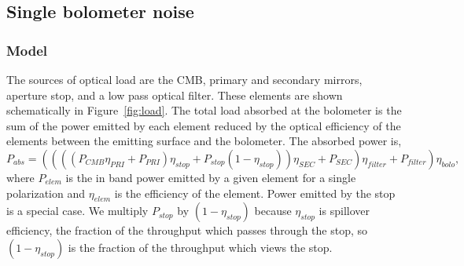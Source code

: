 \documentclass[]{spie}  %
\begin{document}
\subsection{Single bolometer noise}
\label{sec:det_noise}

\subsubsection{Model}

The sources of optical load are the CMB, primary and secondary mirrors, aperture stop, and a low pass optical filter.  These elements 
are shown schematically in Figure~\ref{fig:load}. 
%
The total load absorbed at the bolometer is the sum of the power emitted by each element reduced by the optical efficiency of the elements between 
the emitting surface and the bolometer.  
The absorbed power is,
\begin{equation}
\label{eq:load}
P_{abs} =  (((( P_{CMB} \eta_{PRI} + P_{PRI} ) \eta_{stop} + P_{stop}(1-\eta_{stop}) ) \eta_{SEC} + P_{SEC})\eta_{filter} + P_{filter}) \eta_{bolo},
\end{equation} 
where $P_{elem}$ is the in band power emitted by a given element for a single polarization and $\eta_{elem}$ is the efficiency 
of the element. %
Power emitted by the stop is a special case. We multiply $P_{stop}$ by 
$(1-\eta_{stop})$ because $\eta_{stop}$ is spillover efficiency, the fraction of the throughput which passes through the stop, so $(1-\eta_{stop})$ 
is the fraction of the throughput which views the stop.  
\end{document}
